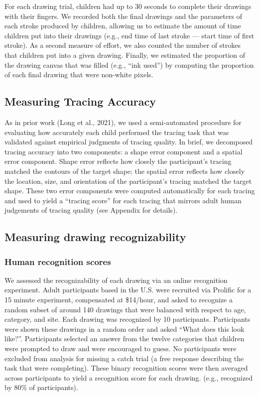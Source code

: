 \documentclass[
  english,
  man]{apa6}
\begin{document}
For each drawing trial, children had up to 30 seconds to complete their drawings with their fingers. We recorded both the final drawings and the parameters of each stroke produced by children, allowing us to estimate the amount of time children put into their drawings (e.g., end time of last stroke --- start time of first stroke). As a second measure of effort, we also counted the number of strokes that children put into a given drawing. Finally, we estimated the proportion of the drawing canvas that was filled (e.g., \enquote{ink used}) by computing the proportion of each final drawing that were non-white pixels.

\hypertarget{measuring-tracing-accuracy}{%
\subsection{Measuring Tracing Accuracy}\label{measuring-tracing-accuracy}}

As in prior work (Long et al., 2021), we used a semi-automated procedure for evaluating how accurately each child performed the tracing task that was validated against empirical judgments of tracing quality. In brief, we decomposed tracing accuracy into two components: a shape error component and a spatial error component. Shape error reflects how closely the participant's tracing matched the contours of the target shape; the spatial error reflects how closely the location, size, and orientation of the participant's tracing matched the target shape. These two error components were computed automatically for each tracing and used to yield a \enquote{tracing score} for each tracing that mirrors adult human judgements of tracing quality (see Appendix for details).

\hypertarget{measuring-drawing-recognizability}{%
\subsection{Measuring drawing recognizability}\label{measuring-drawing-recognizability}}

\hypertarget{human-recognition-scores}{%
\subsubsection{Human recognition scores}\label{human-recognition-scores}}

We assessed the recognizability of each drawing via an online recognition experiment. Adult participants based in the U.S. were recruited via Prolific for a 15 minute experiment, compensated at \$14/hour, and asked to recognize a random subset of around 140 drawings that were balanced with respect to age, category, and site. Each drawing was recognized by 10 participants. Participants were shown these drawings in a random order and asked \enquote{What does this look like?}. Participants selected an answer from the twelve categories that children were prompted to draw and were encouraged to guess. No participants were excluded from analysis for missing a catch trial (a free response describing the task that were completing). These binary recognition scores were then averaged across participants to yield a recognition score for each drawing.
(e.g., recognized by 80\% of participants).
\end{document}
